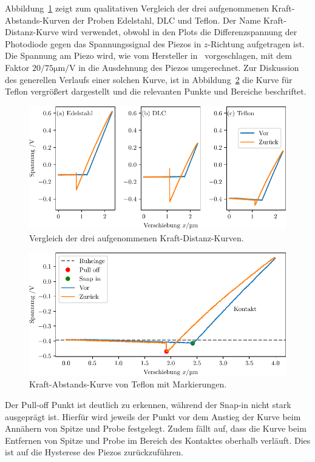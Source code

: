 Abbildung~\ref{fig: force_distance} zeigt zum qualitativen Vergleich der drei aufgenommenen Kraft-Abstands-Kurven der Proben
Edelstahl, DLC und Teflon. Der Name Kraft-Distanz-Kurve wird verwendet, obwohl in den Plots die Differenzspannung der Photodiode
gegen das Spannungssignal des Piezos in $z$-Richtung aufgetragen ist. Die Spannung am Piezo wird, wie vom Hersteller in~\cite{afm_datasheet}
vorgeschlagen, mit dem Faktor $20 / 75 \si{\micro\meter\per\volt}$ in die Ausdehnung des Piezos umgerechnet.
Zur Diskussion des generellen Verlaufs einer solchen Kurve, ist in Abbildung~\ref{fig: force_distance_teflon} die Kurve
für Teflon vergrößert dargestellt und die relevanten Punkte und Bereiche beschriftet.
\begin{figure}
  \centering
  \includegraphics[scale = 1]{../analysis/data/force_distance/force_distance.pdf}
  \caption{Vergleich der drei aufgenommenen Kraft-Distanz-Kurven.}
  \label{fig: force_distance}
\end{figure}
\begin{figure}
  \centering
  \includegraphics[scale = 1]{../analysis/data/force_distance/force_distance_teflon.pdf}
  \caption{Kraft-Abstands-Kurve von Teflon mit Markierungen.}
  \label{fig: force_distance_teflon}
\end{figure}
Der Pull-off Punkt ist deutlich zu erkennen, während der Snap-in nicht stark ausgeprägt ist. Hierfür wird
jeweils der Punkt vor dem Anstieg der Kurve beim Annähern von Spitze und Probe festgelegt. Zudem fällt auf, dass
die Kurve beim Entfernen von Spitze und Probe im Bereich des Kontaktes oberhalb verläuft. Dies ist auf die
Hysterese des Piezos zurückzuführen.

